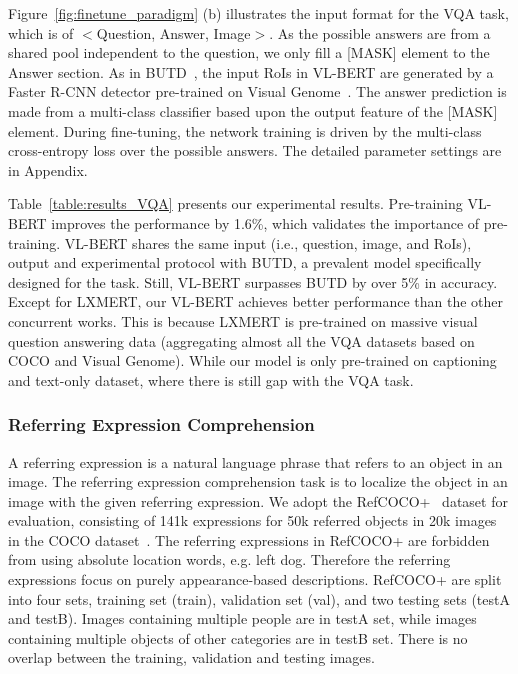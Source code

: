 Figure~\ref{fig:finetune_paradigm} (b) illustrates the input format for the VQA task, which is of $<$Question, Answer, Image$>$. As the possible answers are from a shared pool independent to the question, we only fill a [MASK] element to the Answer section. As in BUTD~\citep{anderson2018bottom}, the input RoIs in VL-BERT are generated by a Faster R-CNN detector pre-trained on Visual Genome~\citep{krishna2017visual}. The answer prediction is made from a multi-class classifier based upon the output feature of the [MASK] element. During fine-tuning, the network training is driven by the multi-class cross-entropy loss over the possible answers. The detailed parameter settings are in Appendix.

Table~\ref{table:results_VQA} presents our experimental results. Pre-training VL-BERT improves the performance by 1.6\%, which validates the importance of pre-training. VL-BERT shares the same input (i.e., question, image, and RoIs), output and experimental protocol with BUTD, a prevalent model specifically designed for the task. Still, VL-BERT surpasses BUTD by over 5\% in accuracy.  Except for LXMERT, our VL-BERT achieves better performance than the other concurrent works. This is because LXMERT is pre-trained on massive visual question answering data (aggregating almost all the VQA datasets based on COCO and Visual Genome). While our model is only pre-trained on captioning and text-only dataset, where there is still gap with the VQA task.

\subsubsection{Referring Expression Comprehension}

A referring expression is a natural language phrase that refers to an object in an image. The referring expression comprehension task is to localize the object in an image with the given referring expression. We adopt the RefCOCO+~\citep{kazemzadeh2014referitgame} dataset for evaluation, consisting of 141k expressions for 50k referred objects in 20k images in the COCO dataset~\citep{lin2014microsoft}. The referring expressions in RefCOCO+ are forbidden from using absolute location words, e.g. left dog. Therefore the referring expressions focus on purely appearance-based descriptions. RefCOCO+ are split into four sets, training set (train), validation set (val), and two testing sets (testA and testB). Images containing multiple people are in testA set, while images containing multiple objects of other categories are in testB set. There is no overlap between the training, validation and testing images.

